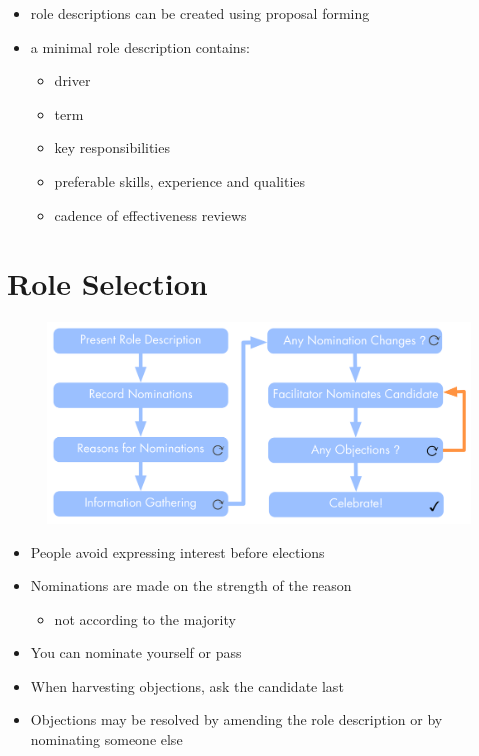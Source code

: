\begin{itemize}
\item role descriptions can be created using proposal forming

\item a minimal role description contains:

\begin{itemize}
\item driver

\item term

\item key responsibilities

\item preferable skills, experience and qualities

\item cadence of effectiveness reviews

\end{itemize}

\end{itemize}

\section{Role Selection}
\label{roleselection}

\begin{figure}[htbp]
\centering
\includegraphics[keepaspectratio,width=\textwidth,height=0.75\textheight]{img/people-and-roles/elections.png}
\end{figure}

\begin{itemize}
\item People avoid expressing interest before elections

\item Nominations are made on the strength of the reason

\begin{itemize}
\item not according to the majority

\end{itemize}

\item You can nominate yourself or pass

\item When harvesting objections, ask the candidate last

\item Objections may be resolved by amending the role description or by nominating someone else

\end{itemize}

